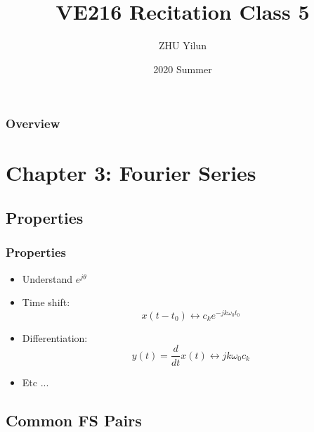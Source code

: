 \documentclass{beamer}
\title[VE216]{VE216 Recitation Class 5} %
\author{ZHU Yilun} %
\institute[SJTU] %
{
UM-SJTU Joint Institute \\ %
\medskip
\textit{VE216 SU20 Teaching Group} %
}
\date{2020 Summer} %
\begin{document}
\begin{frame}
\titlepage %
\end{frame}

\begin{frame}
\frametitle{Overview} %
\tableofcontents %
\end{frame}


\section{Chapter 3: Fourier Series}

\subsection{Properties}

\begin{frame}
   \frametitle{Properties} 
   \begin{itemize}
       \item Understand $ e^{j\theta}$
       \item Time shift: \[ x(t-t_0) \longleftrightarrow c_k e^{-jk\omega_0 t_0}  \]
       \item Differentiation: \[ y(t) = \frac{d}{dt} x(t) \longleftrightarrow jk\omega_0 c_k \]
       \item Etc ...
   \end{itemize}
\end{frame}

\subsection{Common FS Pairs}
\end{document}
